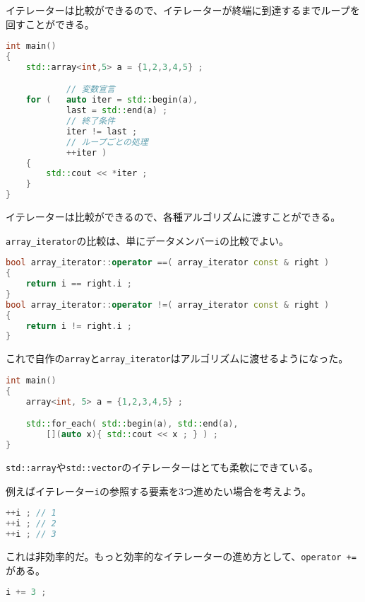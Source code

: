 イテレーターは比較ができるので、イテレーターが終端に到達するまでループを回すことができる。

\begin{lstlisting}[language={C++}]
int main()
{
    std::array<int,5> a = {1,2,3,4,5} ;

            // 変数宣言
    for (   auto iter = std::begin(a),
            last = std::end(a) ;
            // 終了条件
            iter != last ;
            // ループごとの処理
            ++iter )
    {
        std::cout << *iter ;
    }
}
\end{lstlisting}

イテレーターは比較ができるので、各種アルゴリズムに渡すことができる。

\texttt{array\_iterator}の比較は、単にデータメンバー\texttt{i}の比較でよい。

\ifTombow\pagebreak\fi
\begin{lstlisting}[language={C++}]
bool array_iterator::operator ==( array_iterator const & right )
{
    return i == right.i ;
}
bool array_iterator::operator !=( array_iterator const & right )
{
    return i != right.i ;
}
\end{lstlisting}

これで自作の\texttt{array}と\texttt{array\_iterator}はアルゴリズムに渡せるようになった。

\begin{lstlisting}[language={C++}]
int main()
{
    array<int, 5> a = {1,2,3,4,5} ;

    std::for_each( std::begin(a), std::end(a),
        [](auto x){ std::cout << x ; } ) ;
}
\end{lstlisting}


\texttt{std::array}や\texttt{std::vector}のイテレーターはとても柔軟にできている。

例えばイテレーター\texttt{i}の参照する要素を3つ進めたい場合を考えよう。

\begin{lstlisting}[language={C++}]
++i ; // 1
++i ; // 2
++i ; // 3
\end{lstlisting}

これは非効率的だ。もっと効率的なイテレーターの進め方として、\texttt{operator +=}\,がある。

\begin{lstlisting}[language={C++}]
i += 3 ;
\end{lstlisting}

